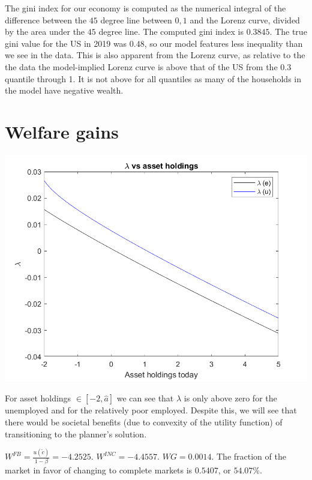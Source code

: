 \documentclass[11pt]{article} %
\begin{document}
The gini index for our economy is computed as the numerical integral of the difference between the $45$ degree line between $0,1$ and the Lorenz curve, divided by the area under the $45$ degree line. The computed gini index is $0.3845$. The true gini value for the US in 2019 was $0.48$, so our model features less inequality than we see in the data. This is also apparent from the Lorenz curve, as relative to the the data the model-implied Lorenz curve is above that of the US from the 0.3 quantile through 1. It is not above for all quantiles as many of the households in the model have negative wealth.
\section{Welfare gains}

\includegraphics{lambda}

For asset holdings $\in [-2,\hat{a}]$ we can see that $\lambda$ is only above zero for the unemployed and for the relatively poor employed. Despite this, we will see that there would be societal benefits (due to convexity of the utility function) of transitioning to the planner's solution.

$W^{FB} = \frac{u(\tilde{c})}{1-\beta} = -4.2525$. $W^{INC} = -4.4557$. $WG = 0.0014$. The fraction of the market in favor of changing to complete markets is $0.5407$, or $54.07\%$.
\end{document}
